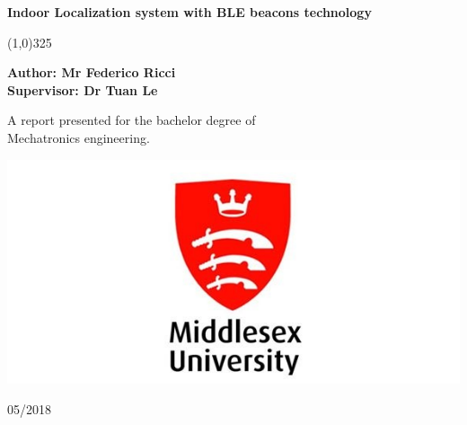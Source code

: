 \documentclass[12]{report}
\begin{document}
	
	\begin{titlepage}
		
		\begin{center}
			\vspace*{0.5cm}			
			\Huge
			\textbf{Indoor Localization system with BLE beacons technology}		
			
			\begin{center}
				\line(1,0){325}	
			\end{center}			
		
			\vspace{0.5cm}
			
			\Large		
			\textbf{Author: Mr Federico Ricci}\\
			\textbf{Supervisor: Dr Tuan Le}	
			
			\vfill		
			A report presented for the bachelor degree of\\
			Mechatronics engineering.\\	
			
			\vspace{0.8cm}		
			
			\includegraphics[width=1.0\textwidth]{middlesex}
			
			\vspace{0.8cm}
						
			\Large


			\vspace{0.25cm}
			05/2018
			
		\end{center}
		\newpage
		\thispagestyle{empty}
		\mbox{}
	\end{titlepage}

	
	

	
	
	\newpage
	\thispagestyle{plain}
	\mbox{}
	
	

	
\end{document}
